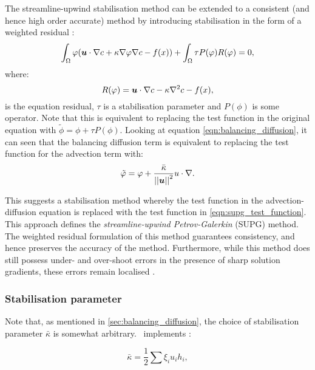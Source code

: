 The streamline-upwind stabilisation method can be extended to a consistent (and
hence high order accurate) method by introducing stabilisation in the form of a weighted
residual \citep{DoneaBook}:
\begin{equation*}
  \int_\Omega \varphi ({\mbox{\boldmath$u$}} \cdot \nabla c + \kappa \nabla \varphi \nabla c - f(x)) +
  \int_\Omega \tau P(\varphi) R(\varphi)
  = 0,
\end{equation*}
where:
\begin{equation*}
  R(\varphi) = {\mbox{\boldmath$u$}} \cdot \nabla c - \kappa \nabla^2 c - f(x),
\end{equation*}
is the equation residual, $\tau$ is a stabilisation parameter and $P(\phi)$ is
some operator.
Note that this is equivalent to replacing the test function in the original
equation with $\tilde{\phi} = \phi + \tau P(\phi)$.
Looking at equation \eqref{eqn:balancing_diffusion}, it can seen that the
balancing diffusion term is equivalent to replacing the test function for the
advection term with:
\begin{equation}\label{eqn:supg_test_function}
  \tilde{\varphi} = \varphi + \frac{\bar{\kappa}}{\left|\left| {\mbox{\boldmath$u$}} \right|\right|^2} u \cdot \nabla.
\end{equation}

This suggests a stabilisation method whereby the test function in the advection-diffusion
equation is replaced with the test function in \eqref{eqn:supg_test_function}.
This approach defines the \textit{streamline-upwind Petrov-Galerkin} (SUPG) method. The
weighted residual formulation of this method guarantees consistency, and hence
preserves the accuracy of the method. Furthermore, while this method does
still possess under- and over-shoot errors in the presence of sharp solution
gradients, these errors remain localised \citep{hughes1987}.

\subsubsection{Stabilisation parameter}\label{sec:stabilisation_parameter}

Note that, as mentioned in \ref{sec:balancing_diffusion}, the choice of
stabilisation parameter $\bar{\kappa}$ is somewhat arbitrary. \fluidity\ implements \citep{brooks1982, DoneaBook}:

\begin{equation}\label{eqn:md_nu_bar}
  \bar{\kappa} = \frac{1}{2} \sum{\xi_i u_i h_i},
\end{equation}

